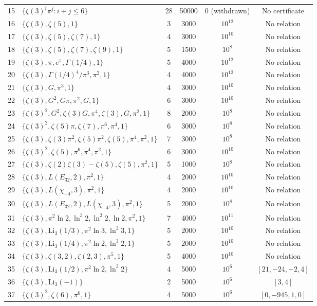 \documentclass[12pt]{article}
\theoremstyle{definition}
\theoremstyle{remark}
\begin{document}
\begin{longtable}{@{}clcccc@{}}
15 & $\{\zeta(3)^i\pi^j:i+j\le 6\}$ & 28 & 50000 & $0$ (withdrawn) & No certificate \\
16 & $\{\zeta(3),\zeta(5),1\}$ & 3 & 3000 & $10^{12}$ & No relation \\
17 & $\{\zeta(3),\zeta(5),\zeta(7),1\}$ & 4 & 3000 & $10^{10}$ & No relation \\
18 & $\{\zeta(3),\zeta(5),\zeta(7),\zeta(9),1\}$ & 5 & 1500 & $10^{8}$ & No relation \\
19 & $\{\zeta(3),\pi,e^\pi,\Gamma(1/4),1\}$ & 5 & 4000 & $10^{12}$ & No relation \\
20 & $\{\zeta(3),\Gamma(1/4)^4/\pi^3,\pi^2,1\}$ & 4 & 4000 & $10^{12}$ & No relation \\
21 & $\{\zeta(3),G,\pi^3,1\}$ & 4 & 3000 & $10^{10}$ & No relation \\
22 & $\{\zeta(3),G^2,G\pi,\pi^2,G,1\}$ & 6 & 3000 & $10^{10}$ & No relation \\
23 & $\{\zeta(3)^2,G^2,\zeta(3)G,\pi^4,\zeta(3),G,\pi^2,1\}$ & 8 & 2000 & $10^{8}$ & No relation \\
24 & $\{\zeta(3)^2,\zeta(5)\pi,\zeta(7),\pi^6,\pi^4,1\}$ & 6 & 3000 & $10^{8}$ & No relation \\
25 & $\{\zeta(3),\zeta(3)\pi^2,\zeta(5)\pi^2,\zeta(5),\pi^4,\pi^2,1\}$ & 7 & 3000 & $10^{8}$ & No relation \\
26 & $\{\zeta(3)^2,\zeta(5),\pi^6,\pi^4,\pi^2,1\}$ & 6 & 3000 & $10^{10}$ & No relation \\
27 & $\{\zeta(3),\zeta(2)\zeta(3){-}\zeta(5),\zeta(5),\pi^2,1\}$ & 5 & 1000 & $10^{8}$ & No relation \\
28 & $\{\zeta(3),L(E_{32},2),\pi^2,1\}$ & 4 & 2000 & $10^{10}$ & No relation \\
29 & $\{\zeta(3),L(\chi_{-4},3),\pi^2,1\}$ & 4 & 2000 & $10^{10}$ & No relation \\
30 & $\{\zeta(3),L(E_{32},2),L(\chi_{-4},3),\pi^2,1\}$ & 5 & 2000 & $10^{8}$ & No relation \\
31 & $\{\zeta(3),\pi^2\ln 2,\ln^{3} 2,\ln^{2} 2,\ln 2,\pi^2,1\}$ & 7 & 4000 & $10^{11}$ & No relation \\
32 & $\{\zeta(3),\mathrm{Li}_3(1/3),\pi^2\ln 3,\ln^{3} 3,1\}$ & 5 & 2000 & $10^{10}$ & No relation \\
33 & $\{\zeta(3),\mathrm{Li}_3(1/4),\pi^2\ln 2,\ln^{3} 2,1\}$ & 5 & 2000 & $10^{10}$ & No relation \\
34 & $\{\zeta(3),\zeta(3,2),\zeta(2,3),\pi^5,1\}$ & 5 & 4000 & $10^{10}$ & No relation \\
\midrule
35 & $\{\zeta(3),\mathrm{Li}_3(1/2),\pi^2\ln 2,\ln^{3} 2\}$ & 4 & 5000 & $10^{6}$ & $[21,-24,-2,4]$ \\
36 & $\{\zeta(3),\mathrm{Li}_3(-1)\}$ & 2 & 5000 & $10^{6}$ & $[3,4]$ \\
37 & $\{\zeta(3)^2,\zeta(6),\pi^6,1\}$ & 4 & 5000 & $10^{6}$ & $[0,-945,1,0]$ \\
\end{longtable}
\end{document}
